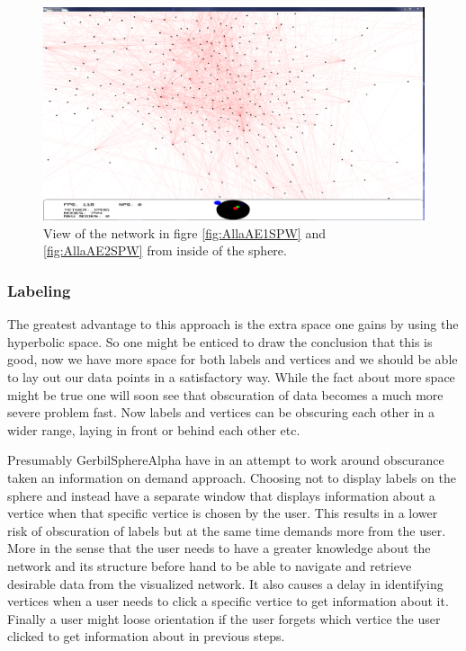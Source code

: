 \documentclass[a4paper,11pt]{kth-mag}
\begin{document}
\begin{figure}[!htbp]
	\centering
	\includegraphics[scale=0.3]{SesammVisualAppPics/SphericalView/AE/AE5}
	\caption{View of the network in figre \ref{fig:AllaAE1SPW} and \ref{fig:AllaAE2SPW} from inside of the sphere.}
	\label{fig:AllaAE3SPW}
\end{figure}
\newpage
\subsubsection{Labeling}
The greatest advantage to this approach is the extra space one gains by using the hyperbolic space. So one
 might be enticed to draw the conclusion that this is good, now we have more space for both labels and 
 vertices and we should be able to lay out our data points in a satisfactory way. While the fact about more space might be true one will soon see that obscuration of data becomes a much more severe problem fast.
 Now labels and vertices can be obscuring each other in a wider range, laying in front or behind each other etc.
 
Presumably GerbilSphereAlpha have in an attempt to work around obscurance taken an information on demand approach. Choosing not to display labels on the
sphere and instead have a separate window that displays information about a vertice when that specific vertice is chosen by the user.
This results in a lower risk of obscuration of labels but at the same time demands more from the user. More in the
sense that the user needs to have a greater knowledge about the network and its structure before hand to be able
to navigate and retrieve desirable data from the visualized network. It also causes a delay in identifying 
vertices when a user needs to click a specific vertice to get information about it. Finally a user might loose orientation
if the user forgets which vertice the user clicked to get information about in previous steps.
\end{document}
